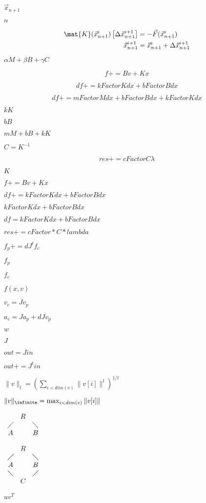 \documentclass{article}
\begin{document}
$\vec{x}_{n+1}$
\pagebreak

$n$
\pagebreak

\begin{align*} \mat{K}(\vec{x}_{n+1}^i) \left [ \Delta \vec{x}_{n+1}^{i+1} \right ] &= - \vec{F}(\vec{x}_{n+1}^i) \\ \vec{x}_{n+1}^{i+1} &= \vec{x}_{n+1}^{i} + \Delta \vec{x}_{n+1}^{i+1} \end{align*}
\pagebreak

$ \alpha M + \beta B + \gamma C $
\pagebreak

\[ f += B v + K x \]
\pagebreak

\[ df += kFactor K dx + bFactor B dx \]
\pagebreak

\[ df += mFactor M dx + bFactor B dx + kFactor K dx \]
\pagebreak

$ k K $
\pagebreak

$ b B $
\pagebreak

$ m M + b B + k K $
\pagebreak

$ C = K^{-1} $
\pagebreak

\[ res += cFactor C \lambda \]
\pagebreak

$ K $
\pagebreak

$ f += B v + K x $
\pagebreak

$ df += kFactor K dx + bFactor B dx $
\pagebreak

$ kFactor K dx + bFactor B dx $
\pagebreak

$ df = kFactor K dx + bFactor B dx $
\pagebreak

$ res += cFactor * C * lambda $
\pagebreak

$ f_p += dJ^t f_c $
\pagebreak

$ f_p $
\pagebreak

$ f_c $
\pagebreak

$ f(x,v)$
\pagebreak

$ v_c = J v_p $
\pagebreak

$ a_c = J a_p + dJ v_p $
\pagebreak

$ w $
\pagebreak

$ J $
\pagebreak

$ out = J in $
\pagebreak

$ out += J^t in $
\pagebreak

$ \|v\|_l = ( \sum_{i<dim(v)} \|v[i]\|^{l} )^{1/l} $
\pagebreak

$ \|v\|_\infinite = \max_{i<dim(v)} \|v[i]\| $
\pagebreak

$ \begin{array}{ccc} & R & \\ \diagup & & \diagdown \\ A & & B \end{array} $
\pagebreak

$ \begin{array}{ccc} & R & \\ \diagup & & \diagdown \\ A & & B \\ \diagdown & & \diagup \\ & C \end{array} $
\pagebreak

$ u v^T $
\pagebreak
\end{document}
